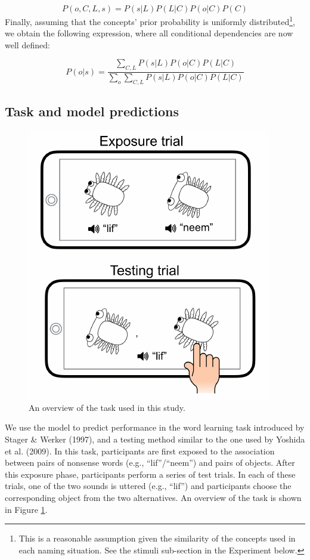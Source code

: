 \documentclass[10pt, letterpaper]{article}
\newenvironment{CodeChunk}{}{}
\begin{document}
\[P(o,C,L,s) = P(s|L)P(L|C)P(o|C)P(C) \] Finally, assuming that the
concepts' prior probability is uniformly
distributed\footnote{This is a reasonable assumption given the similarity of the concepts used in each naming situation. See the stimuli sub-section in the Experiment below.},
we obtain the following expression, where all conditional dependencies
are now well defined:

\begin{equation}
P(o|s) = \frac{\sum_{C,L} P(s|L)P(o|C)P(L|C)}{\sum_{o} \sum_{C,L} P(s|L)P(o|C)P(L|C)}
\end{equation}

\subsection{Task and model
predictions}\label{task-and-model-predictions}

\begin{CodeChunk}
\begin{figure}[t]

{\centering \includegraphics{figs/task-1} 

}

\caption{\label{fig:task}An overview of the task used in this study.}\label{fig:task}
\end{figure}
\end{CodeChunk}

We use the model to predict performance in the word learning task
introduced by Stager \& Werker (1997), and a testing method similar to
the one used by Yoshida et al. (2009). In this task, participants are
first exposed to the association between pairs of nonsense words (e.g.,
``lif''/``neem'') and pairs of objects. After this exposure phase,
participants perform a series of test trials. In each of these trials,
one of the two sounds is uttered (e.g., ``lif'') and participants choose
the corresponding object from the two alternatives. An overview of the
task is shown in Figure \ref{fig:task}.
\end{document}
